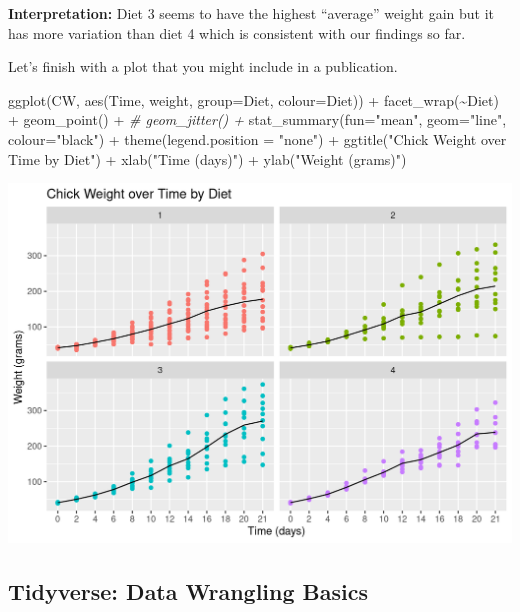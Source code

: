 \documentclass[
  14pt,
]{memoir}
\newenvironment{Shaded}{\begin{snugshade}}{\end{snugshade}}
\newcommand{\AttributeTok}[1]{\textcolor[rgb]{0.77,0.63,0.00}{#1}}
\newcommand{\CommentTok}[1]{\textcolor[rgb]{0.56,0.35,0.01}{\textit{#1}}}
\newcommand{\FunctionTok}[1]{\textcolor[rgb]{0.00,0.00,0.00}{#1}}
\newcommand{\NormalTok}[1]{#1}
\newcommand{\SpecialCharTok}[1]{\textcolor[rgb]{0.00,0.00,0.00}{#1}}
\newcommand{\StringTok}[1]{\textcolor[rgb]{0.31,0.60,0.02}{#1}}
\begin{document}
\textbf{Interpretation:}
Diet 3 seems to have the highest ``average'' weight gain but it has more variation
than diet 4 which is consistent with our findings so far.

Let's finish with a plot that you might include in a publication.

\begin{Shaded}
\begin{Highlighting}[]
\FunctionTok{ggplot}\NormalTok{(CW, }\FunctionTok{aes}\NormalTok{(Time, weight, }\AttributeTok{group=}\NormalTok{Diet, }
                             \AttributeTok{colour=}\NormalTok{Diet)) }\SpecialCharTok{+}
  \FunctionTok{facet\_wrap}\NormalTok{(}\SpecialCharTok{\textasciitilde{}}\NormalTok{Diet) }\SpecialCharTok{+}
  \FunctionTok{geom\_point}\NormalTok{() }\SpecialCharTok{+}
  \CommentTok{\# geom\_jitter() +}
  \FunctionTok{stat\_summary}\NormalTok{(}\AttributeTok{fun=}\StringTok{"mean"}\NormalTok{, }\AttributeTok{geom=}\StringTok{"line"}\NormalTok{,}
               \AttributeTok{colour=}\StringTok{"black"}\NormalTok{) }\SpecialCharTok{+}
  \FunctionTok{theme}\NormalTok{(}\AttributeTok{legend.position =} \StringTok{"none"}\NormalTok{) }\SpecialCharTok{+}
  \FunctionTok{ggtitle}\NormalTok{(}\StringTok{"Chick Weight over Time by Diet"}\NormalTok{) }\SpecialCharTok{+} 
  \FunctionTok{xlab}\NormalTok{(}\StringTok{"Time (days)"}\NormalTok{) }\SpecialCharTok{+}
  \FunctionTok{ylab}\NormalTok{(}\StringTok{"Weight (grams)"}\NormalTok{)}
\end{Highlighting}
\end{Shaded}

\begin{center}\includegraphics[width=0.8\linewidth]{figure/minimal-finalPlot-1} \end{center}

\hypertarget{tidyverse-data-wrangling-basics}{%
\subsection{Tidyverse: Data Wrangling Basics}\label{tidyverse-data-wrangling-basics}}
\end{document}
